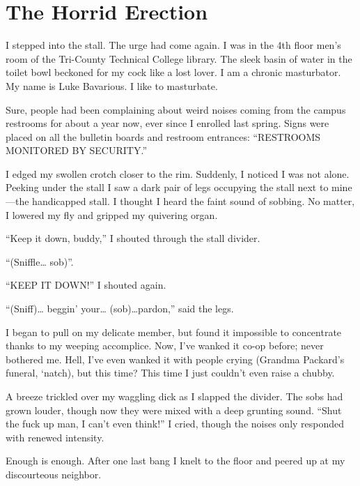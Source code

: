 \chapter{The Horrid Erection}


I stepped into the stall. The urge had come again. I was in the 4th
floor men's room of the Tri-County Technical College library.
The sleek basin of water in the toilet bowl beckoned for my cock
like a lost lover. I am a chronic masturbator. My name is Luke
Bavarious. I like to masturbate.



Sure, people had been complaining about weird noises coming from
the campus restrooms for about a year now, ever since I enrolled
last spring. Signs were placed on all the bulletin boards and
restroom entrances: ``RESTROOMS MONITORED BY
SECURITY.''



I edged my swollen crotch closer to the rim. Suddenly, I noticed I
was not alone. Peeking under the stall I saw a dark pair of legs
occupying the stall next to mine---the handicapped stall. I
thought I heard the faint sound of sobbing. No matter, I lowered my
fly and gripped my quivering organ.



``Keep it down, buddy,'' I shouted through the stall
divider.

``(Sniffle{\ldots} sob)''.

``KEEP IT DOWN!'' I shouted again.

``(Sniff){\ldots} beggin' your{\ldots}
(sob){\ldots}pardon,'' said the legs.



I began to pull on my delicate member, but found it impossible to
concentrate thanks to my weeping accomplice. Now, I've wanked
it co-op before; never bothered me. Hell, I've even wanked it
with people crying (Grandma Packard's funeral, `natch),
but this time? This time I just couldn't even raise a
chubby.



A breeze trickled over my waggling dick as I slapped the divider.
The sobs had grown louder, though now they were mixed with a deep
grunting sound. ``Shut the fuck up man, I can't even
think!'' I cried, though the noises only responded with
renewed intensity.



Enough is enough. After one last bang I knelt to the floor and
peered up at my discourteous neighbor.



